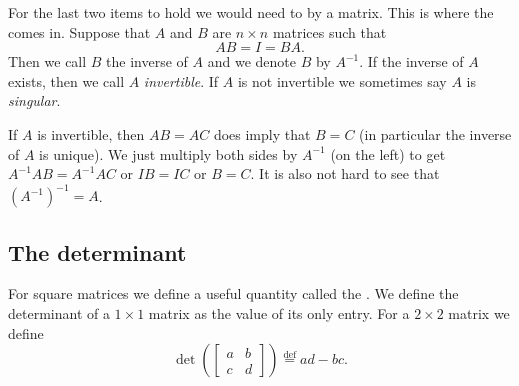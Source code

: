 \documentclass[12pt]{book}
\begin{document}
For the last two items to hold we would need to  by
a matrix.  This is where the \emph{} comes in.
Suppose that $A$ and $B$ are $n \times n$ matrices such that
\begin{equation*}
AB = I = BA .
\end{equation*}
Then we call $B$ the inverse of $A$ and we denote $B$ by $A^{-1}$.
If the inverse of $A$ exists, then we call $A$
\emph{invertible}.
If $A$ is not invertible we sometimes say $A$ is
\emph{singular}.

If $A$ is invertible, then $AB = AC$ does imply
that $B = C$ (in particular the inverse of $A$ is unique).
We just multiply both sides by $A^{-1}$ (on the left) to get
$A^{-1}AB = A^{-1}AC$ or $IB=IC$ or $B=C$.
It is also not hard to see that ${(A^{-1})}^{-1} = A$.

\subsection{The determinant}

For square matrices we define a useful quantity called the
\emph{}.  We define
the determinant of a $1 \times 1$ matrix as the value of its only entry.
For a $2 \times 2$ matrix we define
\begin{equation*}
\det \left(
\begin{bmatrix}
a & b \\
c & d
\end{bmatrix}
\right)
\overset{\text{def}}{=}
ad-bc .
\end{equation*}
\end{document}
